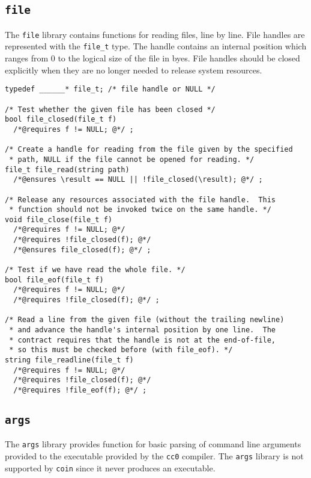 \documentclass[11pt]{article}
\begin{document}
\subsection{\tt file}

The \verb'file' library contains functions for reading files, line by
line.  File handles are represented with the \verb'file_t' type.  The
handle contains an internal position which ranges from 0 to the
logical size of the file in byes.  File handles should be closed
explicitly when they are no longer needed to release system resources.

\begin{small}
\begin{verbatim}
typedef ______* file_t; /* file handle or NULL */

/* Test whether the given file has been closed */
bool file_closed(file_t f)
  /*@requires f != NULL; @*/ ;

/* Create a handle for reading from the file given by the specified
 * path, NULL if the file cannot be opened for reading. */
file_t file_read(string path)
  /*@ensures \result == NULL || !file_closed(\result); @*/ ;

/* Release any resources associated with the file handle.  This
 * function should not be invoked twice on the same handle. */
void file_close(file_t f)
  /*@requires f != NULL; @*/
  /*@requires !file_closed(f); @*/
  /*@ensures file_closed(f); @*/ ; 

/* Test if we have read the whole file. */
bool file_eof(file_t f)
  /*@requires f != NULL; @*/
  /*@requires !file_closed(f); @*/ ; 

/* Read a line from the given file (without the trailing newline)
 * and advance the handle's internal position by one line.  The
 * contract requires that the handle is not at the end-of-file,
 * so this must be checked before (with file_eof). */
string file_readline(file_t f)
  /*@requires f != NULL; @*/
  /*@requires !file_closed(f); @*/
  /*@requires !file_eof(f); @*/ ;
\end{verbatim}
\end{small}

\clearpage
\subsection{\tt args}

The \verb'args' library provides function for basic parsing of command
line arguments provided to the executable provided by the \verb'cc0'
compiler.  The \verb'args' library is not supported by \verb'coin'
since it never produces an executable.
\end{document}
